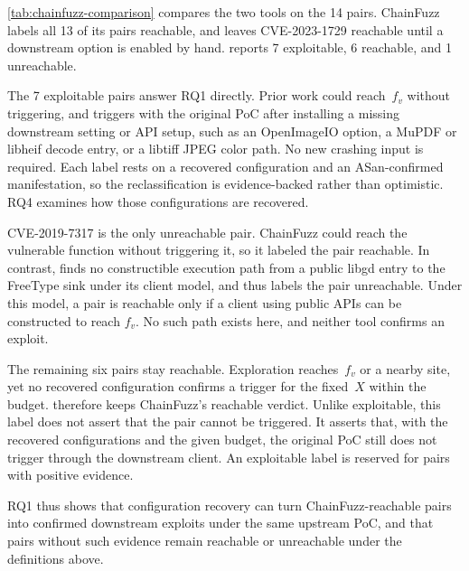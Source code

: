 \autoref{tab:chainfuzz-comparison} compares the two tools on the 14 pairs.
ChainFuzz labels all 13 of its pairs reachable, and leaves CVE-2023-1729 reachable until a downstream option is enabled by hand.
\sys reports 7 exploitable, 6 reachable, and 1 unreachable.

The 7 exploitable pairs answer RQ1 directly.
Prior work could reach~$f_v$ without triggering, and \sys triggers with the original PoC after installing a missing downstream setting or API setup, such as an OpenImageIO option, a MuPDF or libheif decode entry, or a libtiff JPEG color path.
No new crashing input is required.
Each label rests on a recovered configuration and an ASan-confirmed manifestation, so the reclassification is evidence-backed rather than optimistic.
RQ4 examines how those configurations are recovered.

CVE-2019-7317 is the only unreachable pair.
ChainFuzz could reach the vulnerable function without triggering it, so it labeled the pair reachable.
In contrast, \sys finds no constructible execution path from a public libgd entry to the FreeType sink under its client model, and thus labels the pair unreachable. 
Under this model, a pair is reachable only if a client using public APIs can be constructed to reach $f_v$.
No such path exists here, and neither tool confirms an exploit.

The remaining six pairs stay reachable.
Exploration reaches~$f_v$ or a nearby site, yet no recovered configuration confirms a trigger for the fixed~$X$ within the budget.
\sys therefore keeps ChainFuzz's reachable verdict.
Unlike exploitable, this label does not assert that the pair cannot be triggered.
It asserts that, with the recovered configurations and the given budget, the original PoC still does not trigger through the downstream client.
An exploitable label is reserved for pairs with positive evidence.

RQ1 thus shows that configuration recovery can turn ChainFuzz-reachable pairs into confirmed downstream exploits under the same upstream PoC, and that pairs without such evidence remain reachable or unreachable under the definitions above.


